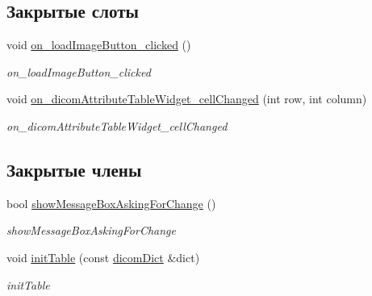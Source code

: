 \subsection*{Закрытые слоты}
\begin{DoxyCompactItemize}
\item 
void \hyperlink{classViewerForm_aebe4c92a2d951281558a7074347a7ec7}{on\+\_\+load\+Image\+Button\+\_\+clicked} ()
\begin{DoxyCompactList}\small\item\em on\+\_\+load\+Image\+Button\+\_\+clicked \end{DoxyCompactList}\item 
void \hyperlink{classViewerForm_a298b0181b562b7521e62212db1976cdd}{on\+\_\+dicom\+Attribute\+Table\+Widget\+\_\+cell\+Changed} (int row, int column)
\begin{DoxyCompactList}\small\item\em on\+\_\+dicom\+Attribute\+Table\+Widget\+\_\+cell\+Changed \end{DoxyCompactList}\end{DoxyCompactItemize}
\subsection*{Закрытые члены}
\begin{DoxyCompactItemize}
\item 
bool \hyperlink{classViewerForm_a8b7701ce8061967e519b691aa5a9ec93}{show\+Message\+Box\+Asking\+For\+Change} ()
\begin{DoxyCompactList}\small\item\em show\+Message\+Box\+Asking\+For\+Change \end{DoxyCompactList}\item 
void \hyperlink{classViewerForm_a2c109da65b355c5e9712a148b01ee7f3}{init\+Table} (const \hyperlink{tagshelpers_8h_ae25d30658f61420b88a380dc9e40bb74}{dicom\+Dict} \&dict)
\begin{DoxyCompactList}\small\item\em init\+Table \end{DoxyCompactList}\end{DoxyCompactItemize}

